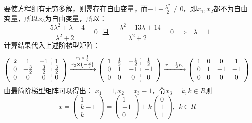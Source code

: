 \documentclass[a4paper]{report}
\begin{document}
\begin{jie}
要使方程组有无穷多解，则需存在自由变量，而$-1-\frac{\lambda^2}{2}\neq 0$，即$x_1,x_2$都不为自由变量，所以$x_3$为自由变量，所以：
\begin{equation*}
\frac{-5\lambda^2+\lambda+4}{\lambda^2+2}=0~~~\text{且}~~~\frac{-\lambda^2-13\lambda+14}{\lambda^2+2}=0~~~\Rightarrow~~~\lambda =1
\end{equation*}
计算结果代入上述阶梯型矩阵：
\begin{equation*}
 \left(
 \begin{array}{c:c}
\begin{matrix}
2 & 1 & -1 \\
0 & -\frac{3}{2} & \frac{3}{2} \\
0 & 0 & 0
\end{matrix}&
\begin{matrix}
1  \\
\frac{3}{2}\\
0
\end{matrix}
\end{array}
\right)\xrightarrow{\substack{r_{1}\times\frac{1}{2}\\ r_2\times\left(-\frac{2}{3}\right)}}
{
 \left(
 \begin{array}{c:c}
\begin{matrix}
1 & \frac{1}{2} & -\frac{1}{2} \\
0 & 1 & -1 \\
0 & 0 & 0
\end{matrix}&
\begin{matrix}
\frac{1 }{2} \\
-1\\
0
\end{matrix}
\end{array}
\right)
}\xrightarrow{\substack{r_{1}-\frac{1}{2}r_2}}
{
 \left(
 \begin{array}{c:c}
\begin{matrix}
1 & 0 & 0 \\
0 & 1 & -1 \\
0 & 0 & 0
\end{matrix}&
\begin{matrix}
1 \\
-1\\
0
\end{matrix}
\end{array}
\right)
}
\end{equation*}
由最简阶梯型矩阵可以得出：
$x_1=1,x_2=x_3-1$，令$x_3=k,k\in R$则
\begin{equation*}
x=
\begin{pmatrix}
1\\ k-1\\ k
\end{pmatrix}=
\begin{pmatrix}
1\\ -1\\ 0
\end{pmatrix}+k\begin{pmatrix}
0\\ 1\\ 1
\end{pmatrix},~~k\in R
\end{equation*}
\end{jie}
\end{document}
